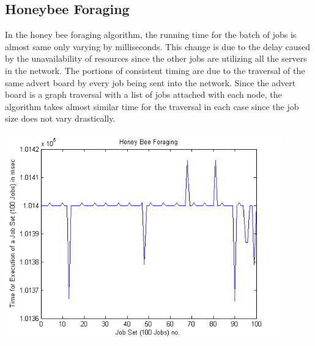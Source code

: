 \subsection{Honeybee Foraging}
In the honey bee foraging algorithm, the running time for the batch of jobs is almost same only varying by milliseconds. This change is due to the delay caused by the unavailability of resources since the other jobs are utilizing all the servers in the network. The portions of consistent timing are due to the traversal of the same advert board by every job being sent into the network. Since the advert board is a graph traversal with a list of jobs attached with each node, the algorithm takes almost similar time for the traversal in each case since the job size does not vary drastically.
\begin{center}
\includegraphics[width=0.9\textwidth]{honeybee}\\[0.3cm]
\end{center}

